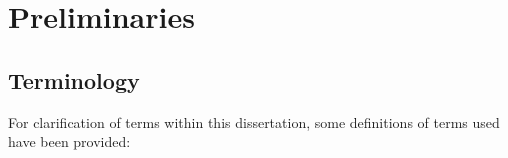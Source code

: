 \chapter{Preliminaries}
\label{intro}




\section{Terminology}
For clarification of terms within this dissertation, some definitions of terms used have been provided: 
\label{introducing_technology}

